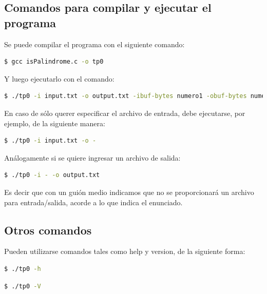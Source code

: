 \documentclass[a4paper]{article}
\begin{document}
\subsection{Comandos para compilar y ejecutar el programa}

Se puede compilar el programa con el siguiente comando:

\begin{lstlisting}[language=bash]
  $ gcc isPalindrome.c -o tp0
\end{lstlisting}


Y luego ejecutarlo con el comando:

\begin{lstlisting}[language=bash]
  $ ./tp0 -i input.txt -o output.txt -ibuf-bytes numero1 -obuf-bytes numero2
\end{lstlisting}

En caso de sólo querer especificar el archivo de entrada, debe ejecutarse, por ejemplo, de la siguiente manera:

\begin{lstlisting}[language=bash]
  $ ./tp0 -i input.txt -o -
\end{lstlisting}

Análogamente si se quiere ingresar un archivo de salida:

\begin{lstlisting}[language=bash]
  $ ./tp0 -i - -o output.txt
\end{lstlisting}

Es decir que con un guión medio indicamos que no se proporcionará un archivo para entrada/salida, acorde a lo que indica el enunciado.

\subsection{Otros comandos}

Pueden utilizarse comandos tales como help y version, de la siguiente forma:

\begin{lstlisting}[language=bash]
  $ ./tp0 -h
\end{lstlisting}

\begin{lstlisting}[language=bash]
  $ ./tp0 -V
\end{lstlisting}
\end{document}
